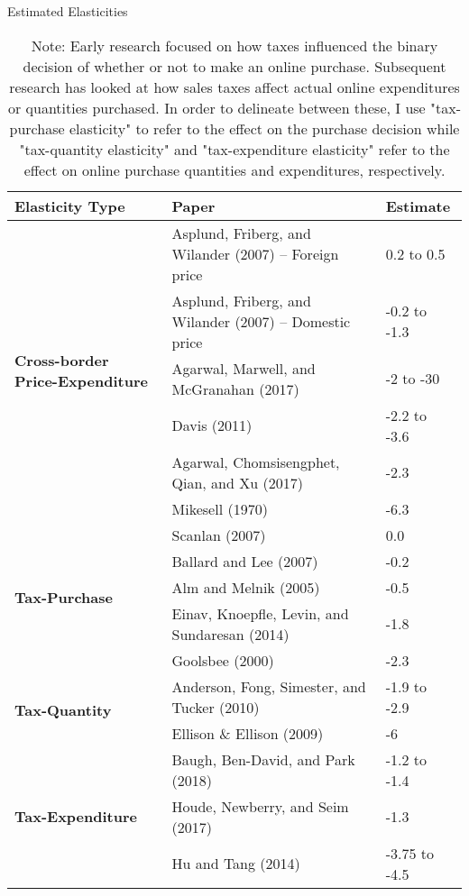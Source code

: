 \begin{table}
\centering
\caption{Estimated Elasticities}
\label{tab:elasticity}
\begin{tabular}{lll}
\hline
\textbf{Elasticity Type}           & \textbf{Paper}                     & \textbf{Estimate}     \\
\hline \hline
\multirow{6}{3.5cm}{\textbf{Cross-border Price-Expenditure}} &
  Asplund, Friberg, and Wilander (2007) -- Foreign price    & 0.2 to 0.5   \\
& Asplund, Friberg, and Wilander (2007) -- Domestic price & -0.2 to -1.3 \\
& Agarwal, Marwell, and McGranahan (2017)                 & -2 to -30    \\
& Davis (2011)                                        & -2.2 to -3.6 \\
& Agarwal, Chomsisengphet, Qian, and Xu (2017)            & -2.3         \\
& Mikesell (1970)                                     & -6.3         \\ \hline
\multirow{5}{3.5cm}{\textbf{Tax-Purchase}} &
  Scanlan (2007)                                        &  0.0          \\
& Ballard and Lee (2007)                               & -0.2          \\
& Alm and Melnik (2005)                                & -0.5          \\
& Einav, Knoepfle, Levin, and Sundaresan (2014)        & -1.8          \\
& Goolsbee (2000)                                     & -2.3          \\ \hline
\multirow{2}{3.5cm}{\textbf{Tax-Quantity}} &
  Anderson, Fong, Simester, and Tucker (2010)          & -1.9 to -2.9  \\
& Ellison \& Ellison (2009)                           & -6            \\ \hline
\multirow{3}{3.5cm}{\textbf{Tax-Expenditure}} &
  Baugh, Ben-David, and Park (2018)                      & -1.2 to -1.4  \\
& Houde, Newberry, and Seim (2017)                     & -1.3          \\
& Hu and Tang (2014)                                  & -3.75 to -4.5 \\ \hline
\end{tabular}
\caption*{Note: Early research focused on how taxes influenced the binary decision of whether or not to make an online purchase. Subsequent research has looked at how sales taxes affect actual online expenditures or quantities purchased. In order to delineate between these, I use "tax-purchase elasticity" to refer to the effect on the purchase decision while "tax-quantity elasticity" and "tax-expenditure elasticity" refer to the effect on online purchase quantities and expenditures, respectively.}
\end{table}
